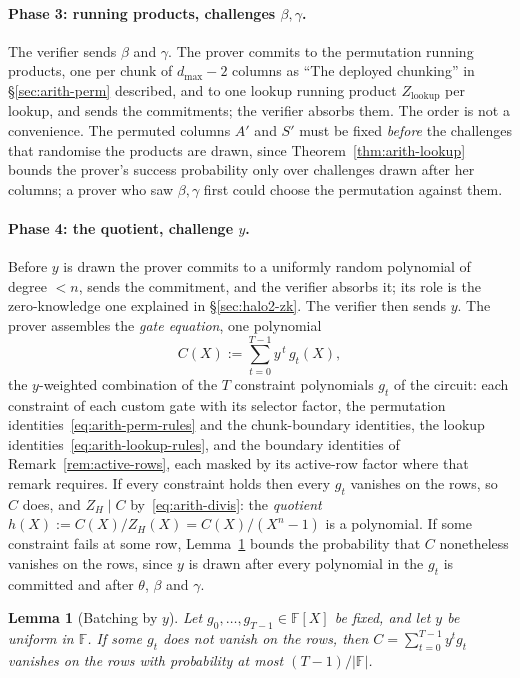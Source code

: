 \documentclass[11pt,a4paper]{article}
\newtheorem{lemma}[theorem]{Lemma}
\theoremstyle{definition}
\newcommand{\F}{\mathbb{F}}
\newcommand{\ZH}{Z_H}
\begin{document}
\paragraph{Phase 3: running products, challenges $\beta, \gamma$.}
The verifier sends $\beta$ and $\gamma$. The prover commits to the
permutation running products, one per chunk of $d_{\max} - 2$ columns as
``The deployed chunking'' in \S\ref{sec:arith-perm} described, and to one
lookup running product $Z_{\mathrm{lookup}}$ per lookup, and sends the
commitments; the verifier absorbs them. The order is not a convenience.
The permuted columns $A'$ and $S'$ must be fixed \emph{before} the
challenges that randomise the products are drawn, since
Theorem~\ref{thm:arith-lookup} bounds the prover's success probability
only over challenges drawn after her columns; a prover who saw
$\beta, \gamma$ first could choose the permutation against them.

\paragraph{Phase 4: the quotient, challenge $y$.}
Before $y$ is drawn the prover commits to a uniformly random polynomial
of degree $< n$, sends the commitment, and the verifier absorbs it; its
role is the zero-knowledge one explained in \S\ref{sec:halo2-zk}. The
verifier then sends $y$. The prover assembles the \emph{gate equation},
one polynomial
\[
C(X) := \sum_{t=0}^{T-1} y^{\,t}\, g_t(X),
\]
the $y$-weighted combination of the $T$ constraint polynomials $g_t$ of
the circuit: each constraint of each custom gate with its selector
factor, the permutation identities~\eqref{eq:arith-perm-rules} and the
chunk-boundary identities, the lookup
identities~\eqref{eq:arith-lookup-rules}, and the boundary identities of
Remark~\ref{rem:active-rows}, each masked by its active-row factor where
that remark requires. If every constraint holds then every $g_t$ vanishes
on the rows, so $C$ does, and $\ZH \mid C$ by~\eqref{eq:arith-divis}: the
\emph{quotient} $h(X) := C(X)/\ZH(X) = C(X)/(X^{n} - 1)$ is a polynomial.
If some constraint fails at some row, Lemma~\ref{lem:halo2-y-batch}
bounds the probability that $C$ nonetheless vanishes on the rows, since
$y$ is drawn after every polynomial in the $g_t$ is committed and after
$\theta$, $\beta$ and $\gamma$.

\begin{lemma}[Batching by $y$]\label{lem:halo2-y-batch}
Let $g_0, \dots, g_{T-1} \in \F[X]$ be fixed, and let $y$ be uniform in
$\F$. If some $g_t$ does not vanish on the rows, then
$C = \sum_{t=0}^{T-1} y^{t} g_t$ vanishes on the rows with probability at
most $(T - 1)/|\F|$.
\end{lemma}
\end{document}
